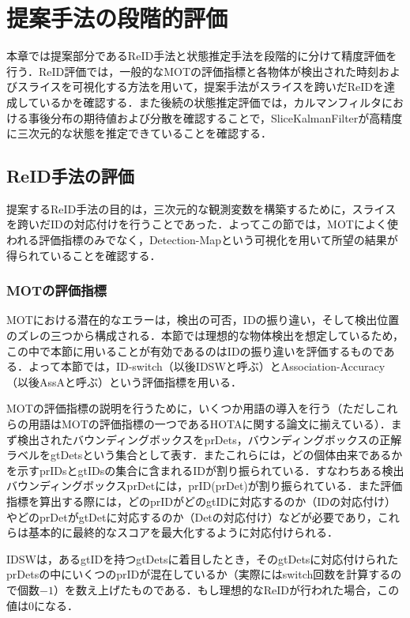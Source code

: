 \section{提案手法の段階的評価}
\label{sec:stage_evaluation}

本章では提案部分であるReID手法と状態推定手法を段階的に分けて精度評価を行う．ReID評価では，一般的なMOTの評価指標と各物体が検出された時刻およびスライスを可視化する方法を用いて，提案手法がスライスを跨いだReIDを達成しているかを確認する．また後続の状態推定評価では，カルマンフィルタにおける事後分布の期待値および分散を確認することで，SliceKalmanFilterが高精度に三次元的な状態を推定できていることを確認する．

    \subsection{ReID手法の評価}
    \label{subsec:reidentification_evaluation}

    提案するReID手法の目的は，三次元的な観測変数を構築するために，スライスを跨いだIDの対応付けを行うことであった．よってこの節では，MOTによく使われる評価指標のみでなく，Detection-Mapという可視化を用いて所望の結果が得られていることを確認する．

        \subsubsection{MOTの評価指標}

        MOTにおける潜在的なエラーは，検出の可否，IDの振り違い，そして検出位置のズレの三つから構成される．本節では理想的な物体検出を想定しているため，この中で本節に用いることが有効であるのはIDの振り違いを評価するものである．よって本節では，ID-switch（以後IDSWと呼ぶ）とAssociation-Accuracy（以後AssAと呼ぶ）という評価指標を用いる．

        MOTの評価指標の説明を行うために，いくつか用語の導入を行う（ただしこれらの用語はMOTの評価指標の一つであるHOTAに関する論文\cite{luiten2021hota}に揃えている）．まず検出されたバウンディングボックスをprDets，バウンディングボックスの正解ラベルをgtDetsという集合として表す．またこれらには，どの個体由来であるかを示すprIDsとgtIDsの集合に含まれるIDが割り振られている．すなわちある検出バウンディングボックスprDetには，prID(prDet)が割り振られている．また評価指標を算出する際には，どのprIDがどのgtIDに対応するのか（IDの対応付け）やどのprDetがgtDetに対応するのか（Detの対応付け）などが必要であり，これらは基本的に最終的なスコアを最大化するように対応付けられる．
    
        IDSW\cite{luiten2021hota}は，あるgtIDを持つgtDetsに着目したとき，そのgtDetsに対応付けられたprDetsの中にいくつのprIDが混在しているか（実際にはswitch回数を計算するので個数$-1$）を数え上げたものである．もし理想的なReIDが行われた場合，この値は$0$になる．
    
